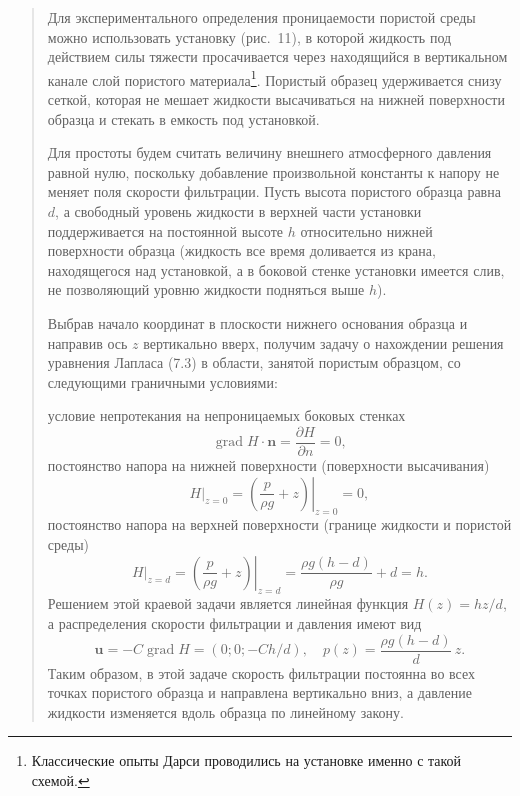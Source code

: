\documentclass[12pt,a4paper]{article}
\DeclareMathOperator{\grad}{grad}
\newenvironment{textquote}{\begin{quote}\sloppy}{\end{quote}}
\begin{document}
\begin{textquote}
Для экспериментального определения проницаемости пористой среды можно использовать установку (рис.~11), в которой жидкость под действием силы тяжести просачивается через находящийся в вертикальном канале слой пористого материала\footnote[1]{Классические опыты Дарси проводились на установке именно с такой схемой.}. Пористый образец удерживается снизу сеткой, которая не мешает жидкости высачиваться на нижней поверхности образца и стекать в емкость под установкой.



Для простоты будем считать величину внешнего атмосферного давления равной нулю, поскольку добавление произвольной константы к напору не меняет поля скорости фильтрации. Пусть высота пористого образца равна $d$, а свободный уровень жидкости в верхней части установки поддерживается на постоянной высоте $h$ относительно нижней поверхности образца (жидкость все время доливается из крана, находящегося над установкой, а в боковой стенке установки имеется слив, не позволяющий уровню жидкости подняться выше $h$).

Выбрав начало координат в плоскости нижнего основания образца и направив ось $z$ вертикально вверх, получим задачу о нахождении решения уравнения Лапласа (7.3) в области, занятой пористым образцом, со следующими граничными условиями:

условие непротекания на непроницаемых боковых стенках
\[
\grad H\cdot\boldsymbol{n}=\frac{\partial H}{\partial n}=0,
\]
постоянство напора на нижней поверхности (поверхности
высачивания)
\[
\left.H\right|_{z=0}=\left.\left(\frac{p}{\rho g}+z\right)\right|_{z=0}=0,
\]
постоянство напора на верхней поверхности (границе жидкости и пористой среды)
\[
\left.H\right|_{z=d}=\left.\left(\frac{p}{\rho g}+z\right)\right|_{z=d}=\frac{\rho g(h-d)}{\rho g}+d=h.
\]
Решением этой краевой задачи является линейная функция $H(z)=hz/d$, а распределения скорости фильтрации и давления имеют вид
\[
\boldsymbol{u}=-C\grad H=(0;0;-Ch/d),\quad p(z)=\frac{\rho g(h-d)}{d}\,z.
\]
Таким образом, в этой задаче скорость фильтрации постоянна во всех точках пористого образца и направлена вертикально вниз, а давление жидкости изменяется вдоль образца по линейному закону.
\end{textquote}
\end{document}
